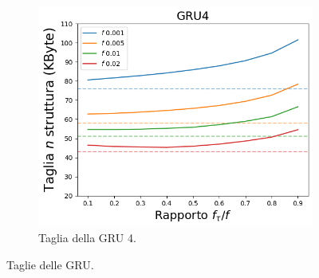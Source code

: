 \documentclass[../../main.tex]{subfiles}
\begin{document}
\begin{figure}[H]
\begin{subfigure}[b]{0.32\textwidth}
            \label{fig:LBFTagliaGRU8}
        \end{subfigure}
        \begin{subfigure}[b]{0.32\textwidth}
            \centering
            \includegraphics[width = \textwidth]{immagini/7/LBF/GRU4_Taglia.png}
            \caption{Taglia della GRU 4.}
            \label{fig:LBFTagliaGRU4}
        \end{subfigure}
        \caption{Taglie delle GRU.}
        \label{fig:taglieGRULBF}
    \end{figure}
\end{document}
